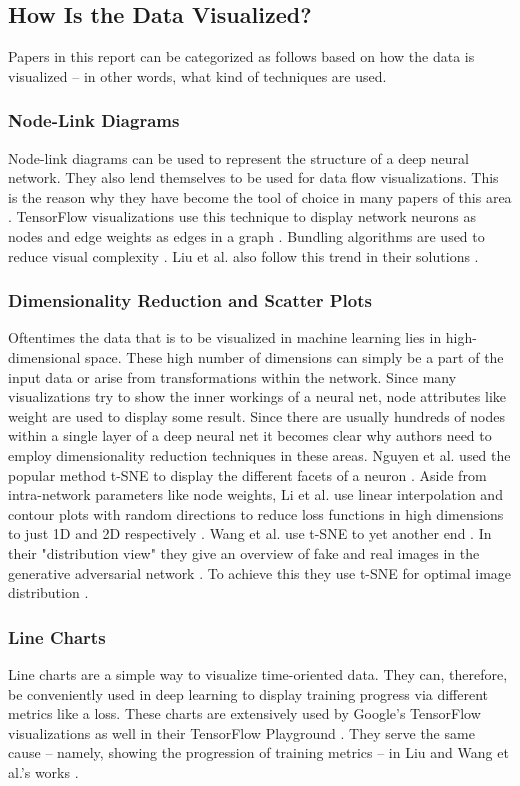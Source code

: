 \documentclass{acmsiggraph}               %
\begin{document}
\subsection{How Is the Data Visualized?}
Papers in this report can be categorized as follows based on how the data is visualized -- in other words, what kind of techniques are used.
\subsubsection{Node-Link Diagrams}
Node-link diagrams can be used to represent the structure of a deep neural network. They also lend themselves to be used for data flow visualizations. This is the reason why they have become the tool of choice in many papers of this area \cite{Hohman2018}. TensorFlow visualizations use this technique to display network neurons as nodes and edge weights as edges in a graph \cite{Wongsuphasawat2018}. Bundling algorithms are used to reduce visual complexity \cite{Hohman2018,Wongsuphasawat2018}. Liu et al. also follow this trend in their solutions \cite{Liu2016,Liu2018}.
\subsubsection{Dimensionality Reduction and Scatter Plots}
Oftentimes the data that is to be visualized in machine learning lies in high-dimensional space. These high number of dimensions can simply be a part of the input data or arise from transformations within the network. Since many visualizations try to show the inner workings of a neural net, node attributes like weight are used to display some result. Since there are usually hundreds of nodes within a single layer of a deep neural net it becomes clear why authors need to employ dimensionality reduction techniques in these areas.
Nguyen et al. used the popular method t-SNE to display the different facets of a neuron \cite{Nguyen2016}. 
Aside from intra-network parameters like node weights, Li et al. use linear interpolation and contour plots with random directions to reduce loss functions in high dimensions to just 1D and 2D respectively \cite{Li2017}.
Wang et al. use t-SNE to yet another end \cite{Wang}. In their "distribution view" they give an overview of fake and real images in the generative adversarial network \cite{Wang}. To achieve this they use t-SNE for optimal image distribution \cite{Wang}. 
\subsubsection{Line Charts}
Line charts are a simple way to visualize time-oriented data. They can, therefore, be conveniently used in deep learning to display training progress via different metrics like a loss. These charts are extensively used by Google's TensorFlow visualizations as well in their TensorFlow Playground \cite{Wongsuphasawat2018,Smilkov2017}.
They serve the same cause -- namely, showing the progression of training metrics -- in Liu and Wang et al.'s works \cite{Liu2018,Wang}.
\end{document}
